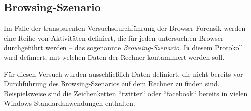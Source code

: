\subsection{Browsing-Szenario}
\label{subsection:methodik-vorbereitung-browsing-szenario}
Im Falle der transparenten Versuchsdurchführung der Browser-Forensik werden eine Reihe von Aktivitäten definiert, die für jeden untersuchten Browser durchgeführt werden -- das sogenannte \textit{Browsing-Szenario}.
In diesem Protokoll wird definiert, mit welchen Daten der Rechner kontaminiert werden soll.

Für diesen Versuch wurden ausschließlich Daten definiert, die nicht bereits vor Durchführung des Browsing-Szenarios auf dem Rechner zu finden sind. Beispielsweise sind die Zeichenketten ``twitter`` oder ``facebook`` bereits in vielen Windows-Standardanwendungen enthalten.

